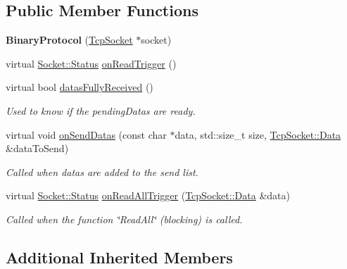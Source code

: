 \subsection*{Public Member Functions}
\begin{DoxyCompactItemize}
\item 
\hypertarget{classmognetwork_1_1protocol_1_1_binary_protocol_a2338021e2845389a21e15cd8d7075dc8}{{\bfseries Binary\-Protocol} (\hyperlink{classmognetwork_1_1_tcp_socket}{Tcp\-Socket} $\ast$socket)}\label{classmognetwork_1_1protocol_1_1_binary_protocol_a2338021e2845389a21e15cd8d7075dc8}

\item 
virtual \hyperlink{classmognetwork_1_1_socket_aa187a8394ac0d6203af0ec7f021ca15f}{Socket\-::\-Status} \hyperlink{classmognetwork_1_1protocol_1_1_binary_protocol_af397288f27924ce552f23f35defb8770}{on\-Read\-Trigger} ()
\item 
virtual bool \hyperlink{classmognetwork_1_1protocol_1_1_binary_protocol_ab945fba1fc99c61de881af2f8e082f9b}{datas\-Fully\-Received} ()
\begin{DoxyCompactList}\small\item\em Used to know if the pending\-Datas are ready. \end{DoxyCompactList}\item 
virtual void \hyperlink{classmognetwork_1_1protocol_1_1_binary_protocol_a7a3c0fbaa42855d9a79fd943bea94960}{on\-Send\-Datas} (const char $\ast$data, std\-::size\-\_\-t size, \hyperlink{classmognetwork_1_1_tcp_socket_aa80d910649a16cedb6c98297e5893ed1}{Tcp\-Socket\-::\-Data} \&data\-To\-Send)
\begin{DoxyCompactList}\small\item\em Called when datas are added to the send list. \end{DoxyCompactList}\item 
virtual \hyperlink{classmognetwork_1_1_socket_aa187a8394ac0d6203af0ec7f021ca15f}{Socket\-::\-Status} \hyperlink{classmognetwork_1_1protocol_1_1_binary_protocol_a15af1a59b3f53351d562414fc3905575}{on\-Read\-All\-Trigger} (\hyperlink{classmognetwork_1_1_tcp_socket_aa80d910649a16cedb6c98297e5893ed1}{Tcp\-Socket\-::\-Data} \&data)
\begin{DoxyCompactList}\small\item\em Called when the function \char`\"{}\-Read\-All\char`\"{} (blocking) is called. \end{DoxyCompactList}\end{DoxyCompactItemize}
\subsection*{Additional Inherited Members}


